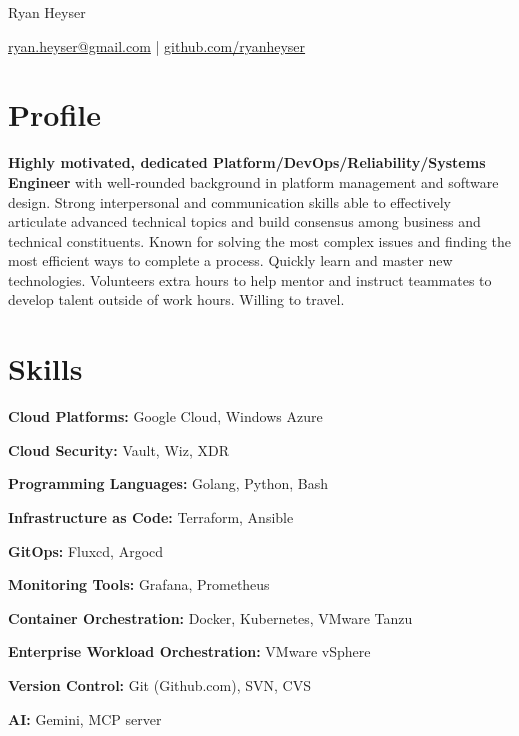 \documentclass[11pt]{article}       %
\begin{document}
\centerline{\Huge Ryan Heyser}

\vspace{5pt}

\centerline{\href{mailto:ryan.heyser@gmail.com}{ryan.heyser@gmail.com} | \href{github.com/ryanheyser}{github.com/ryanheyser}}

\vspace{-18.5pt}

\section*{Profile}
\begin{description}
\item\textbf{Highly motivated, dedicated Platform/DevOps/Reliability/Systems Engineer} with well-rounded background in platform management and software design. Strong interpersonal and communication skills able to effectively articulate advanced technical topics and build consensus among business and technical constituents. Known for solving the most complex issues and finding the most efficient ways to complete a process. Quickly learn and master new technologies. Volunteers extra hours to help mentor and instruct teammates to develop talent outside of work hours. Willing to travel. \\
\end{description}

\vspace{-18.5pt}

\section*{Skills}
\begin{multicols*}{2}
\item\textbf{Cloud Platforms:} Google Cloud, Windows Azure
\vspace{-9.5pt}
\item\textbf{Cloud Security:} Vault, Wiz, XDR
\vspace{-9.5pt}
\item\textbf{Programming Languages:} Golang, Python, Bash
\vspace{-9.5pt}
\item\textbf{Infrastructure as Code:} Terraform, Ansible
\vspace{-9.5pt}
\item\textbf{GitOps:} Fluxcd, Argocd
\vspace{-9.5pt}
\item\textbf{Monitoring Tools:} Grafana, Prometheus
\vspace{-9.5pt}
\item\textbf{Container Orchestration:} Docker, Kubernetes, VMware Tanzu
\vspace{-9.5pt}
\item\textbf{Enterprise Workload Orchestration:} VMware vSphere
\vspace{-9.5pt}
\item\textbf{Version Control:} Git (Github.com), SVN, CVS
\vspace{-9.5pt}
\item\textbf{AI:} Gemini, MCP server
\end{multicols*}
\end{document}

